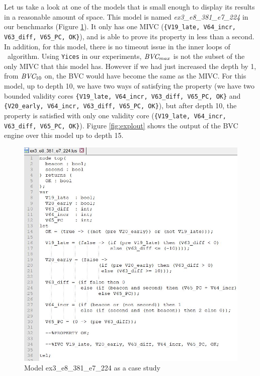 Let us take a look at one of the models that is small enough to display its results in a reasonable amount of space. This model is named \emph{ex3\_e8\_381\_e7\_224} in our benchmarks (Figure \ref{fig:expl}). It only has one MIVC ({\small{\texttt{\{V19\_late, V64\_incr, V63\_diff, V65\_PC, OK\}}}}), and \jkind is able to prove its property in less than a second. In addition, for this model, there is no timeout issue in the inner loops of \aivcalg\ algorithm. Using \texttt{Yices} in our experiments, $\textit{BVC} _{max}$ is not the subset of the only MIVC that this model has. However if we had just increased the depth by 1, from $\textit{BVC} _{10}$ on, the BVC would have become the same as the MIVC. For this model, up to depth 10, we have two ways of satisfying the property (we have two bounded validity cores {\small{\texttt{\{V19\_late, V64\_incr, V63\_diff, V65\_PC, OK\}}}} and {\small{\texttt{\{V20\_early, V64\_incr, V63\_diff, V65\_PC, OK\}}}}), but after depth 10, the property is satisfied with only one validity core ({\small{\texttt{\{V19\_late, V64\_incr, V63\_diff, V65\_PC, OK\}}}}). Figure \ref{fig:explout} shows the output of the \jkind BVC engine over this model up to depth 15.

 \begin{figure}
 \centering
  \includegraphics[width=0.9\columnwidth]{figs/expl.jpg}
  \caption{Model ex3\_e8\_381\_e7\_224 as a case study}
  \vspace{0.1in}
  \label{fig:expl}
\end{figure}

